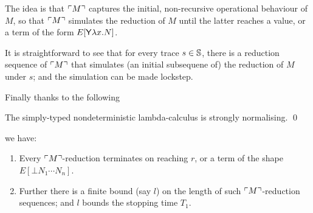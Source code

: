 The idea is that ${\ulcorner{M}\urcorner}$ captures the initial, non-recursive operational behaviour of $M$, so that ${\ulcorner{M}\urcorner}$ simulates the reduction of $M$ until the latter reaches a value, or a term of the form $E[\mathsf{Y} \lambda x. N]$.

It is straightforward to see that for every trace $s \in {\mathbb{S}}$, there is a reduction sequence of ${\ulcorner{M}\urcorner}$ that simulates (an initial subsequene of) the reduction of $M$ under $s$;
and the simulation can be made lockstep.

Finally thanks to the following
\begin{theorem}[de Groote]
\label{thm:de groote}
The simply-typed nondeterministic lambda-calculus is strongly normalising. \qed
\end{theorem}
we have:

\begin{enumerate}
\item Every ${\ulcorner{M}\urcorner}$-reduction terminates on reaching $r$, or a term of the shape $E[\bot N_1 \cdots N_n]$.

\item Further there is a finite bound (say $l$) on the length of such ${\ulcorner{M}\urcorner}$-reduction sequences; and $l$ bounds the stopping time $T_1$.
\end{enumerate}


\iffalse
@inproceedings{DBLP:conf/lfcs/Groote94,
  author    = {Philippe de Groote},
  editor    = {Anil Nerode and
               Yuri V. Matiyasevich},
  title     = {Strong Normalization in a Non-Deterministic Typed Lambda-Calculus},
  booktitle = {Logical Foundations of Computer Science, Third International Symposium,
               LFCS'94, St. Petersburg, Russia, July 11-14, 1994, Proceedings},
  series    = {Lecture Notes in Computer Science},
  volume    = {813},
  pages     = {142--152},
  publisher = {Springer},
  year      = {1994},
  url       = {https://doi.org/10.1007/3-540-58140-5\_15},
  doi       = {10.1007/3-540-58140-5\_15},
  timestamp = {Tue, 14 May 2019 10:00:54 +0200},
  biburl    = {https://dblp.org/rec/conf/lfcs/Groote94.bib},
  bibsource = {dblp computer science bibliography, https://dblp.org}
}
\fi

